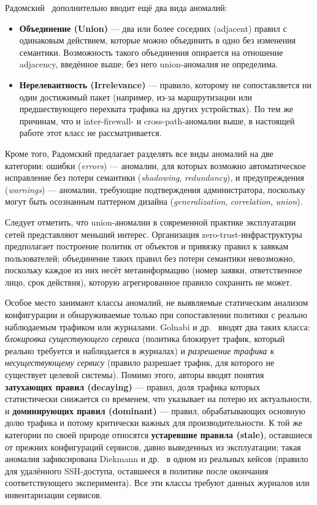 \medskip

Радомский~\cite{radomskiy2011security} дополнительно вводит ещё два вида аномалий:
\begin{itemize}
    \item \textbf{Объединение (Union)} --- два или более соседних (adjacent) правил с одинаковым действием, которые можно объединить в одно без изменения семантики. Возможность такого объединения опирается на отношение adjacency, введённое выше; без него union-аномалия не определима.
    \item \textbf{Нерелевантность (Irrelevance)} --- правило, которому не сопоставляется ни один достижимый пакет (например, из-за маршрутизации или предшествующего перехвата трафика на других устройствах). По тем же причинам, что и inter-firewall- и cross-path-аномалии выше, в настоящей работе этот класс не рассматривается.
\end{itemize}

\medskip

Кроме того, Радомский предлагает разделять все виды аномалий на две категории: ошибки (\emph{errors}) --- аномалии, для которых возможно автоматическое исправление без потери семантики (\emph{shadowing}, \emph{redundancy}), и предупреждения (\emph{warnings}) --- аномалии, требующие подтверждения администратора, поскольку могут быть осознанным паттерном дизайна (\emph{generalization}, \emph{correlation}, \emph{union}).

Следует отметить, что union-аномалии в современной практике эксплуатации сетей представляют меньший интерес. Организация zero-trust-инфраструктуры~\cite{dhiman2024review} предполагает построение политик от объектов и привязку правил к заявкам пользователей; объединение таких правил без потери семантики невозможно, поскольку каждое из них несёт метаинформацию (номер заявки, ответственное лицо, срок действия), которую агрегированное правило сохранить не может.

\medskip

Особое место занимают классы аномалий, не выявляемые статическим анализом конфигурации и обнаруживаемые только при сопоставлении политики с реально наблюдаемым трафиком или журналами. Golnabi и др.~\cite{golnabi2006analysis} вводят два таких класса: \emph{блокировка существующего сервиса} (политика блокирует трафик, который реально требуется и наблюдается в журналах) и \emph{разрешение трафика к несуществующему сервису} (правило разрешает трафик, для которого не существует целевой системы). Помимо этого, авторы вводят понятия \textbf{затухающих правил (decaying)} --- правил, доля трафика которых статистически снижается со временем, что указывает на потерю их актуальности, и \textbf{доминирующих правил (dominant)} --- правил, обрабатывающих основную долю трафика и потому критически важных для производительности. К той же категории по своей природе относятся \textbf{устаревшие правила (stale)}, оставшиеся от прежних конфигураций сервисов, давно выведенных из эксплуатации; такая аномалия зафиксирована Diekmann и др.~\cite{diekmann2018verified} в одном из реальных кейсов (правило для удалённого SSH-доступа, оставшееся в политике после окончания соответствующего эксперимента). Все эти классы требуют данных журналов или инвентаризации сервисов.

